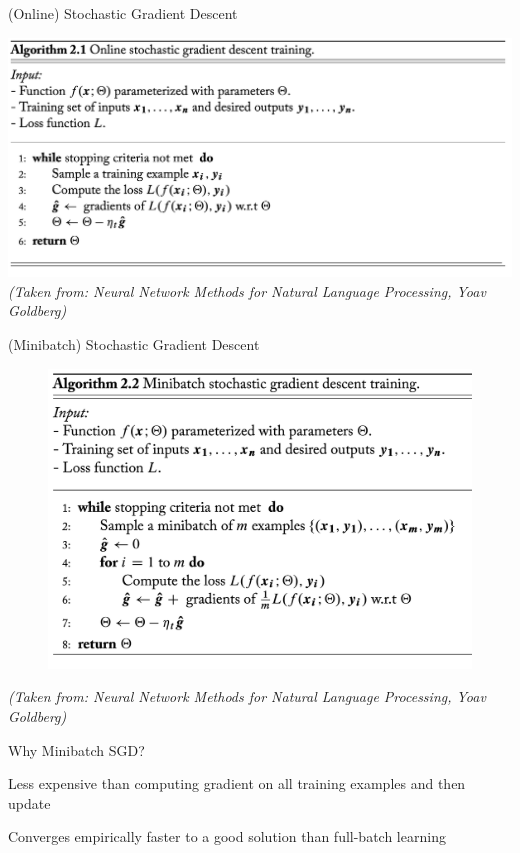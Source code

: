 \documentclass[12pt]{beamer}
\begin{document}
\begin{frame}{(Online) Stochastic Gradient Descent}

\hspace*{-2em}\includegraphics[width=1.15\linewidth]{img/sgd.png}
\vspace*{\fill}
\textit{\tiny{(Taken from: Neural Network Methods for Natural Language Processing, Yoav Goldberg)}}
\end{frame}

\begin{frame}{(Minibatch) Stochastic Gradient Descent}
	\centering
	\begin{figure}
		\includegraphics[width=\linewidth]{img/msgd.png}
	\end{figure}
	\vspace*{\fill}
	\textit{\tiny{(Taken from: Neural Network Methods for Natural Language Processing, Yoav Goldberg)}}
\end{frame}

\begin{frame}{Why Minibatch SGD?}

Less expensive than computing gradient on all training examples and then update

Converges empirically faster to a good solution than full-batch learning

\end{frame}
\end{document}
